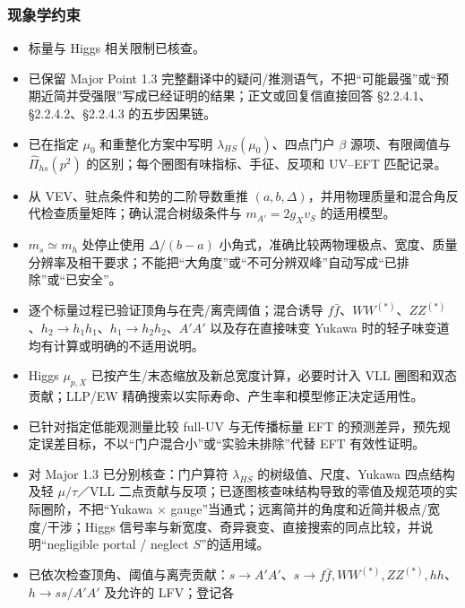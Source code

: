\documentclass[
]{article}
\providecommand{\tightlist}{%
  \setlength{\itemsep}{0pt}\setlength{\parskip}{0pt}}
\begin{document}
\subsubsection{现象学约束}\label{ux73b0ux8c61ux5b66ux7ea6ux675f}

\begin{itemize}
\tightlist
\item[$\square$]
  标量与 Higgs 相关限制已核查。
\item[$\square$]
  已保留 Major Point 1.3
  完整翻译中的疑问/推测语气，不把``可能最强''或``预期近简并受强限''写成已经证明的结果；正文或回复信直接回答
  §2.2.4.1、§2.2.4.2、§2.2.4.3 的五步因果链。
\item[$\square$]
  已在指定 \(\mu_0\) 和重整化方案中写明
  \(\lambda_{HS}(\mu_0)\)、四点门户 \(\beta\) 源项、有限阈值与
  \(\widehat\Pi_{hs}(p^2)\) 的区别；每个圈图有味指标、手征、反项和
  UV--EFT 匹配记录。
\item[$\square$]
  从 VEV、驻点条件和势的二阶导数重推
  \((a,b,\Delta)\)，并用物理质量和混合角反代检查质量矩阵；确认混合树级条件与
  \(m_{A'}=2g_Xv_S\) 的适用模型。
\item[$\square$]
  \(m_s\simeq m_h\) 处停止使用 \(\Delta/(b-a)\)
  小角式，准确比较两物理极点、宽度、质量分辨率及相干要求；不能把``大角度''或``不可分辨双峰''自动写成``已排除''或``已安全''。
\item[$\square$]
  逐个标量过程已验证顶角与在壳/离壳阈值；混合诱导
  \(f\bar f\)、\(WW^{(*)}\)、\(ZZ^{(*)}\)、\(h_2\to h_1h_1\)、\(h_1\to h_2h_2\)、\(A'A'\)
  以及存在直接味变 Yukawa 时的轻子味变道均有计算或明确的不适用说明。
\item[$\square$]
  Higgs \(\mu_{p,X}\) 已按产生/末态缩放及新总宽度计算，必要时计入 VLL
  圈图和双态贡献；LLP/EW
  精确搜索以实际寿命、产生率和模型修正决定适用性。
\item[$\square$]
  已针对指定低能观测量比较 full-UV 与无传播标量 EFT
  的预测差异，预先规定误差目标，不以``门户混合小''或``实验未排除''代替
  EFT 有效性证明。
\item[$\square$]
  对 Major 1.3 已分别核查：门户算符 \(\lambda_{HS}\)
  的树级值、尺度、Yukawa 四点结构及轻 \(\mu/\tau\)／VLL
  二点贡献与反项；已逐图核查味结构导致的零值及规范项的实际圈阶，不把``Yukawa
  × gauge''当通式；远离简并的角度和近简并极点/宽度/干涉；Higgs
  信号率与新宽度、奇异衰变、直接搜索的同点比较，并说明``negligible
  portal / neglect \(S\)''的适用域。
\item[$\square$]
  已依次检查顶角、阈值与离壳贡献：\(s\to A'A'\)、\(s\to f\bar f,WW^{(*)},ZZ^{(*)},hh\)、\(h\to ss/A'A'\)
  及允许的 LFV；登记各

\end{itemize}
\end{document}
